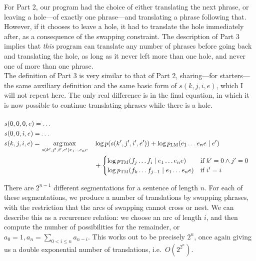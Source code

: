\documentclass[answers]{exam}
\newcommand{\ptm}[1]{p_{\textsc{TM}}(#1)}
\newcommand{\plm}[1]{p_{\textsc{LM}}(#1)}
\DeclareMathOperator*{\argmax}{arg\,max}
\begin{document}
\begin{questions}
\begin{framed}
  For Part 2, our program had the choice of either translating the next phrase,
  or leaving a hole---of exactly one phrase---and translating a phrase following
  that. However, if it chooses to leave a hole, it had to translate the hole
  immediately after, as a consequence of the swapping constraint. 
  The description of Part 3 implies that \emph{this} program can translate any
  number of phrases before going back and translating the hole, as long as it
  never left more than one hole, and never one of more than one phrase. 
  \\
  The definition of Part 3 is very similar to that of Part 2, sharing---for
  starters---the same auxiliary definition and the same basic form of
  $s(k,j,i,e)$, which I will not repeat here. The only real difference is in the
  final equation, in which it is now possible to continue translating phrases
  while there is a hole.
  \\
  \\
  \(\!
  \begin{aligned}
    &s(0,0,0,e) = \ldots\\
    &s(0,0,i,e) = \ldots\\
    &s(k,j,i,e) =
    \argmax_{s(k',j',i',e')e_{1}\dots e_{n}e}
    &&\log{p(s(k',j',i',e'))} + \log{\plm{e_{1}\dots e_{n}e \mid e'}} 
    \\& &&+
    \begin{cases}
      \log{\ptm{f_{j}\dots f_{i} \mid e_{1}\dots e_{n}e}}
      &\text{if }k' = 0 \land j' = 0
      \\
      \log{\ptm{f_{k}\dots f_{j-1} \mid e_{1}\dots e_{n}e}}
      &\text{if }i' = i
    \end{cases}
  \end{aligned}
  \)
\end{framed}


\begin{framed}
  There are $2^{n-1}$ different segmentations for a sentence of length $n$. For
  each of these segmentations, we produce a number of translations by swapping
  phrases, with the restriction that the arcs of swapping cannot cross or nest.
  We can describe this as a recurrence relation: we choose an arc of length $i$,
  and then compute the number of possibilities for the remainder, or $a_0 = 1,
  a_n = \sum_{0 < i \leq n}a_{n-i}$. This works out to be precisely $2^n$, once
  again giving us a double exponential number of translations, i.e.\ $O(2^{2^n})$. 
\end{framed}



\end{questions}
\end{document}

